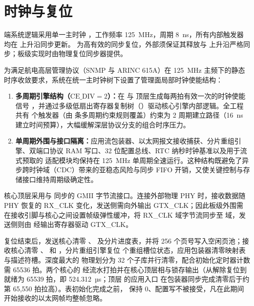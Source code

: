 \section{时钟与复位}\label{sec:clkrst}

端系统逻辑采用单一主时钟 ，工作频率 125~MHz，周期 8~ns，所有内部触发器均在  上升沿同步更新。 为高有效的同步复位，外部须保证其释放与  上升沿严格同步；板级实现时由物理复位同步器提供。

为满足航电高层管理协议（SNMP 与 ARINC 615A）在 125~MHz 主频下的静态时序收敛要求，系统在统一主时钟树下设置了管理面局部时钟使能结构：
\begin{enumerate}[leftmargin=2em,itemsep=1pt]
  \item \textbf{多周期引擎结构（$\text{CE\_DIV}=2$）：}在  与  顶层生成每两拍有效一次的时钟使能信号 ，并通过多级低扇出寄存器复制树（）驱动核心引擎内部逻辑。全工程共有 \MulticycleRegs{} 个触发器（由 \MulticycleRules{} 条多周期约束规则覆盖）约束为 2 周期建立路径（16~ns 建立时间预算），大幅缓解深层协议分支的组合时序压力。
  \item \textbf{单周期外围与接口隔离：}应用流包装器、以太网报文接收捕获、分片重组引擎、双端口协议 RAM 写口、32 位配置总线、RTC 纳秒时钟基准以及用于流式预取的  适配模块均保持在 125~MHz 单周期全速运行。这种结构既避免了异步跨时钟域（CDC）带来的亚稳态风险与同步 FIFO 开销，又使关键控制与存储接口维持周期级确定性。
\end{enumerate}

核心顶层采用与  同步的 GMII 字节流接口。连接外部物理 PHY 时，接收数据随 PHY 恢复的 RX\_CLK 变化，发送侧需向外输出 GTX\_CLK；因此板级外围需在接收引脚与核心之间设置帧级弹性缓冲，将 RX\_CLK 域字节流同步至  域，发送侧则由  经输出寄存器驱动 GTX\_CLK。

复位结束后，发送核心清零 、 及分片进度表，并将 256 个页号写入空闲页池；接收核心清零 、 和 ，分片重组引擎复位 \ReasmContexts{} 个重组槽位状态，应用包装器清零映射表与描述符槽。深度最大的  物理划分为 32 个子库并行清零，配合初始化定时器计数需 65536 拍。两个核心的  经流水打拍并在核心顶层相与锁存输出（从解除复位到  就绪为 65539 拍，即 524.312~µs；顶层  的应用入口  在包装器同步完成清零后于约第 65,550 拍拉高）。表初始化完成之前， 保持 0、配置写不被接受，凡在此期间开始接收的以太网帧均整帧忽略。

